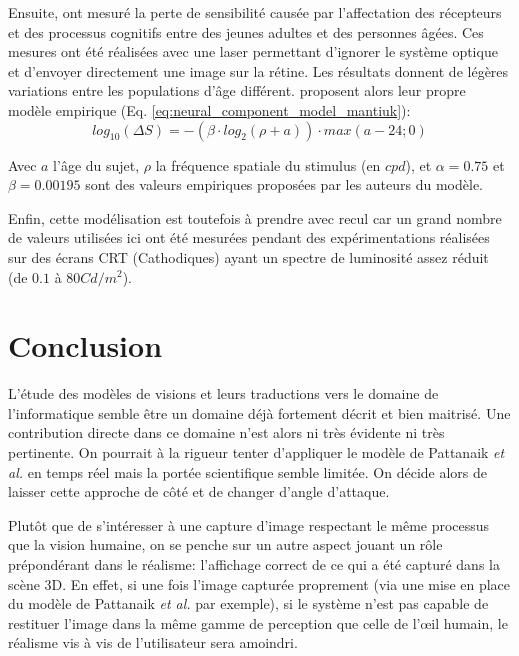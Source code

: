 	\par Ensuite, \citep{burton_aging_1993} ont mesuré la perte de sensibilité causée par l'affectation des récepteurs et des processus cognitifs entre des jeunes adultes et des personnes âgées. Ces mesures ont été réalisées avec une laser permettant d'ignorer le système optique et d'envoyer directement une image sur la rétine. Les résultats donnent de légères variations entre les populations d'âge différent. \citep{mantiuk_human_2015} proposent alors leur propre modèle empirique (Eq. \ref{eq:neural_component_model_mantiuk}):
	\begin{equation}
		log_{10}(\Delta S) = - (\beta \cdot log_2(\rho + a)) \cdot max(a-24;0)
		\label{eq:neural_component_model_mantiuk}
	\end{equation}
	
	\par Avec $a$ l'âge du sujet, $\rho$ la fréquence spatiale du stimulus (en $cpd$), et $\alpha = 0.75$ et $\beta = 0.00195$ sont des valeurs empiriques proposées par les auteurs du modèle.
	
	\par Enfin, cette modélisation est toutefois à prendre avec recul car un grand nombre de valeurs utilisées ici ont été mesurées pendant des expérimentations réalisées sur des écrans CRT (Cathodiques) ayant un spectre de luminosité assez réduit (de $0.1$ à $80 Cd/m^2$).
	
	\chapter*{Conclusion}
	\par L'étude des modèles de visions et leurs traductions vers le domaine de l'informatique semble être un domaine déjà fortement décrit et bien maitrisé. Une contribution directe dans ce domaine n'est alors ni très évidente ni très pertinente. On pourrait à la rigueur tenter d'appliquer le modèle de Pattanaik \textit{et al.} en temps réel mais la portée scientifique semble limitée. On décide alors de laisser cette approche de côté et de changer d'angle d'attaque.
	
	\par Plutôt que de s'intéresser à une capture d'image respectant le même processus que la vision humaine, on se penche sur un autre aspect jouant un rôle prépondérant dans le réalisme: l'affichage correct de ce qui a été capturé dans la scène 3D. En effet, si une fois l'image capturée proprement (via une mise en place du modèle de Pattanaik \textit{et al.} par exemple), si le système n'est pas capable de restituer l'image dans la même gamme de perception que celle de l'œil humain, le réalisme vis à vis de l'utilisateur sera amoindri.